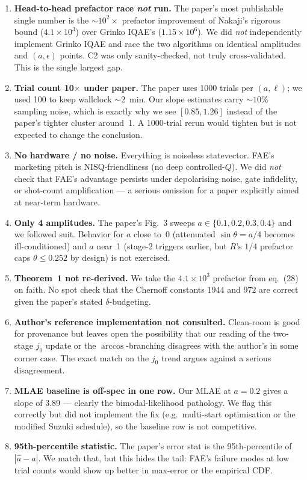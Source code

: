 \documentclass[11pt]{article}
\begin{document}
\begin{enumerate}
    \item \textbf{Head-to-head prefactor race \emph{not} run.} The paper's most publishable single number is the $\sim 10^{2}\times$ prefactor improvement of Nakaji's rigorous bound ($4.1\times 10^{3}$) over Grinko IQAE's ($1.15\times 10^{6}$). We did \emph{not} independently implement Grinko IQAE and race the two algorithms on identical amplitudes and $(a,\epsilon)$ points. C2 was only sanity-checked, not truly cross-validated. This is the single largest gap.
    \item \textbf{Trial count 10$\times$ under paper.} The paper uses 1000 trials per $(a,\ell)$; we used 100 to keep wallclock $\sim 2$~min. Our slope estimates carry $\sim 10\%$ sampling noise, which is exactly why we see $[0.85, 1.26]$ instead of the paper's tighter cluster around~1. A 1000-trial rerun would tighten but is not expected to change the conclusion.
    \item \textbf{No hardware / no noise.} Everything is noiseless statevector. FAE's marketing pitch is NISQ-friendliness (no deep controlled-$Q$). We did \emph{not} check that FAE's advantage persists under depolarising noise, gate infidelity, or shot-count amplification --- a serious omission for a paper explicitly aimed at near-term hardware.
    \item \textbf{Only 4 amplitudes.} The paper's Fig.~3 sweeps $a \in \{0.1, 0.2, 0.3, 0.4\}$ and we followed suit. Behavior for $a$ close to~0 (attenuated $\sin\theta = a/4$ becomes ill-conditioned) and $a$ near~1 (stage-2 triggers earlier, but $R$'s $1/4$ prefactor caps $\theta \leq 0.252$ by design) is not exercised.
    \item \textbf{Theorem~1 not re-derived.} We take the $4.1\times 10^{3}$ prefactor from eq.~(28) on faith. No spot check that the Chernoff constants $1944$ and $972$ are correct given the paper's stated $\delta$-budgeting.
    \item \textbf{Author's reference implementation not consulted.} Clean-room is good for provenance but leaves open the possibility that our reading of the two-stage $j_{0}$ update or the $\arccos$-branching disagrees with the author's in some corner case. The exact match on the $j_{0}$ trend argues against a serious disagreement.
    \item \textbf{MLAE baseline is off-spec in one row.} Our MLAE at $a = 0.2$ gives a slope of $3.89$ --- clearly the bimodal-likelihood pathology. We flag this correctly but did not implement the fix (e.g.\ multi-start optimisation or the modified Suzuki schedule), so the baseline row is not competitive.
    \item \textbf{95th-percentile statistic.} The paper's error stat is the 95th-percentile of $|\hat a - a|$. We match that, but this hides the tail: FAE's failure modes at low trial counts would show up better in max-error or the empirical CDF.
\end{enumerate}
\end{document}
